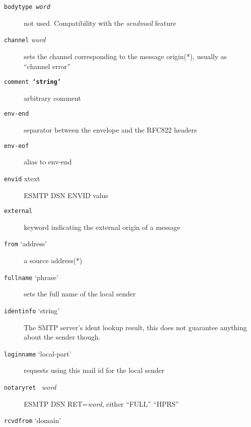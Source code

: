 \begin{description}
\item[{\tt bodytype {\em word\/}} ] \mbox{}

not used. Compatibility with the {\em sendmail\/} feature 

\item[{\tt channel} {\em word\/}] \mbox{}

sets the channel corresponding to the message origin(*), usually as ``channel error''

\item[{\tt comment {\bf `string'}} ] \mbox{}

arbitrary comment

\item[{\tt env-end}] \mbox{}

separator between the envelope and the RFC822 headers

\item[{\tt env-eof}] \mbox{}

alias to env-end

\item[{\tt envid} xtext] \mbox{}

ESMTP DSN ENVID value

\item[{\tt external}] \mbox{}

keyword indicating the external origin of a message

\item[{\tt from} `address'] \mbox{}

a source address(*)

\item[{\tt fullname} `phrase'] \mbox{}

sets the full name of the local sender

\item[{\tt identinfo} `string'] \mbox{}

The SMTP server's ident lookup result, this does not guarantee anything about the sender though.

\item[{\tt loginname} `local-part'] \mbox{}

requests using this mail id for the local sender

\item[{\tt notaryret } {\em word\/}] \mbox{}

ESMTP DSN RET={\em word\/}, either ``FULL'' ``HPRS''

\item[{\tt rcvdfrom} `domain'] \mbox{}


\end{description}

